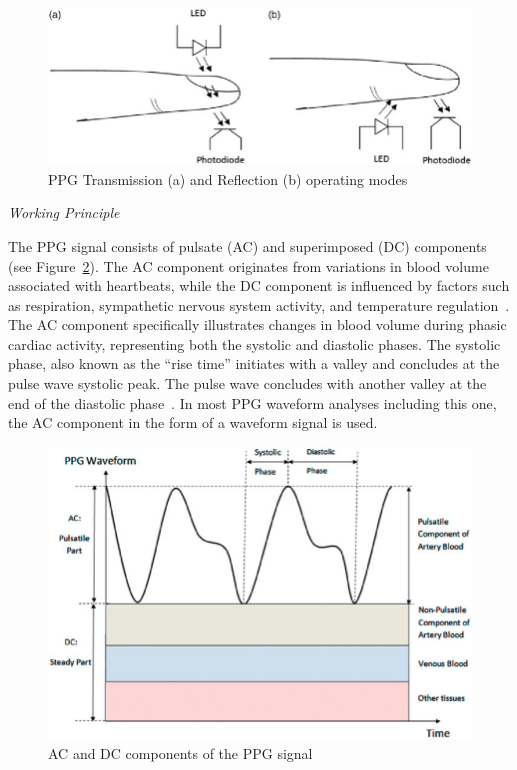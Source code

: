 \begin{figure}[h]
    \centering
    \includegraphics[scale=0.4]{images/ppg/reflection}
    \caption{PPG Transmission (a) and Reflection (b) operating modes \cite{mohanSpotMeasurementHeart2016}}
    \label{fig:reflection}
\end{figure}

\vspace{0.2cm}
\textit{Working Principle}
\vspace{0.2cm}

The PPG signal consists of pulsate (AC) and superimposed (DC) components (see Figure~\ref{fig:acdc}).
The AC component originates from variations in blood volume associated with heartbeats,
while the DC component is influenced by factors such as respiration, sympathetic nervous system activity, and temperature regulation~\cite{allenPhotoplethysmographyItsApplication2007a}.
The AC component specifically illustrates changes in blood volume during phasic cardiac activity, representing both the systolic and diastolic phases.
The systolic phase, also known as the \enquote{rise time} initiates with a valley and concludes at the pulse wave systolic peak.
The pulse wave concludes with another valley at the end of the diastolic phase~\cite{weisslerSystolicTimeIntervals1968}.
In most PPG waveform analyses including this one, the AC component in the form of a waveform signal is used.

\begin{figure}[h]
    \centering
    \includegraphics[scale=0.5]{images/ppg/ac+dc}
    \caption{AC and DC components of the PPG signal \cite{mohanSpotMeasurementHeart2016}}
    \label{fig:acdc}
\end{figure}

